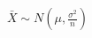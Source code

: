 \documentclass[preview]{standalone}
\begin{document}
\begin{align*}
\bar{X} \sim N(\mu, \frac{\sigma^2}{n})
\end{align*}
\end{document}
